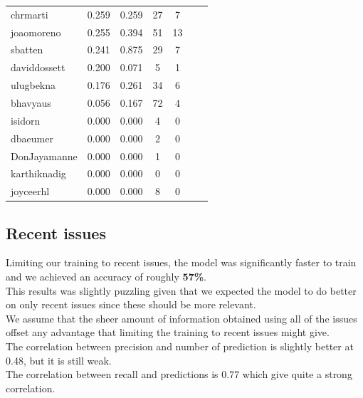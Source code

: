 \documentclass[tikz,10pt,fleqn]{article}
\begin{document}
\begin{table}[H]
\begin{tabular}{@{}lcccccc@{}}
        chrmarti       & 0.259  & 0.259  & 27  & 7   \\
        joaomoreno     & 0.255  & 0.394  & 51  & 13  \\
        sbatten        & 0.241  & 0.875  & 29  & 7   \\
        daviddossett   & 0.200  & 0.071  & 5   & 1   \\
        ulugbekna      & 0.176  & 0.261  & 34  & 6   \\
        bhavyaus       & 0.056  & 0.167  & 72  & 4   \\
        isidorn        & 0.000  & 0.000  & 4   & 0   \\
        dbaeumer       & 0.000  & 0.000  & 2   & 0   \\
        DonJayamanne   & 0.000  & 0.000  & 1   & 0   \\
        karthiknadig   & 0.000  & 0.000  & 0   & 0   \\
        joyceerhl      & 0.000  & 0.000  & 8   & 0   \\ \bottomrule
    \end{tabular}
\end{table}

\subsection*{Recent issues}
Limiting our training to recent issues, the model was significantly faster to train and we achieved an accuracy of roughly \textbf{ 57\%}.\\
This results was slightly puzzling given that we expected the model to do better on only recent issues since these should be more relevant.\\
We assume that the sheer amount of information obtained using all of the issues offset any advantage that limiting the training to recent issues might give.\\
The correlation between precision and number of prediction is slightly better at 0.48, but it is still weak.\\
The correlation between recall and predictions is 0.77 which give quite a strong correlation.
\end{document}
